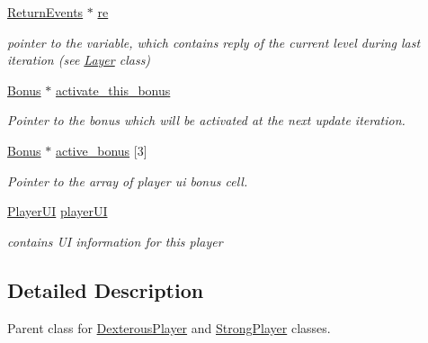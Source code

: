\begin{DoxyCompactItemize}
\mbox{\label{class_player_a652a51b511e40c14cd43c906693670f6}} 
\hyperlink{_events_8h_a51620cf702f1b8fdf47cd0a5cfa0ba4f}{Return\+Events} $\ast$ \hyperlink{class_player_a652a51b511e40c14cd43c906693670f6}{re}
\begin{DoxyCompactList}\small\item\em pointer to the variable, which contains reply of the current level during last iteration (see \hyperlink{class_layer}{Layer} class) \end{DoxyCompactList}\item 
\mbox{\label{class_player_ac1b10a27f5fac807cd2a2ff00018b18d}} 
\hyperlink{class_bonus}{Bonus} $\ast$ \hyperlink{class_player_ac1b10a27f5fac807cd2a2ff00018b18d}{activate\+\_\+this\+\_\+bonus}
\begin{DoxyCompactList}\small\item\em Pointer to the bonus which will be activated at the next update iteration. \end{DoxyCompactList}\item 
\mbox{\label{class_player_aa9320da45054e6196476c46b9b0ac794}} 
\hyperlink{class_bonus}{Bonus} $\ast$ \hyperlink{class_player_aa9320da45054e6196476c46b9b0ac794}{active\+\_\+bonus} \mbox{[}3\mbox{]}
\begin{DoxyCompactList}\small\item\em Pointer to the array of player ui bonus cell. \end{DoxyCompactList}\item 
\mbox{\label{class_player_a31637dcf493a77b73258e87641b339d4}} 
\hyperlink{class_player_u_i}{Player\+UI} \hyperlink{class_player_a31637dcf493a77b73258e87641b339d4}{player\+UI}
\begin{DoxyCompactList}\small\item\em contains UI information for this player \end{DoxyCompactList}\end{DoxyCompactItemize}


\subsection{Detailed Description}
Parent class for \hyperlink{class_dexterous_player}{Dexterous\+Player} and \hyperlink{class_strong_player}{Strong\+Player} classes. 

